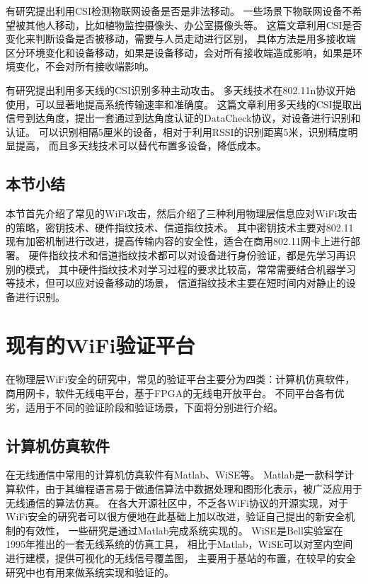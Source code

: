 		有研究提出利用CSI检测物联网设备是否是非法移动\cite{acsac15iot}。
		一些场景下物联网设备不希望被其他人移动，比如植物监控摄像头、办公室摄像头等。
		这篇文章利用CSI是否变化来判断设备是否被移动，需要与人员走动进行区别，
		具体方法是用多接收端区分环境变化和设备移动，如果是设备移动，会对所有接收端造成影响，如果是环境变化，不会对所有接收端影响。

		有研究提出利用多天线的CSI识别多种主动攻击\cite{mobicom13securearray}。
		多天线技术在802.11n协议开始使用，可以显著地提高系统传输速率和准确度。
		这篇文章利用多天线的CSI提取出信号到达角度，提出一套通过到达角度认证的DataCheck协议，对设备进行识别和认证。
		可以识别相隔5厘米的设备，相对于利用RSSI的识别距离5米\cite{wisec06spoofing}，识别精度明显提高，
		而且多天线技术可以替代布置多设备，降低成本。

		\subsection{本节小结}
		本节首先介绍了常见的WiFi攻击，然后介绍了三种利用物理层信息应对WiFi攻击的策略，密钥技术、硬件指纹技术、信道指纹技术。
		其中密钥技术主要对802.11现有加密机制进行改进，提高传输内容的安全性，适合在商用802.11网卡上进行部署。
		硬件指纹技术和信道指纹技术都可以对设备进行身份验证，都是先学习再识别的模式，
		其中硬件指纹技术对学习过程的要求比较高，常常需要结合机器学习等技术，但可以应对设备移动的场景，
		信道指纹技术主要在短时间内对静止的设备进行识别。

	\section{现有的WiFi验证平台}\label{sec:related_work}
	在物理层WiFi安全的研究中，常见的验证平台主要分为四类：计算机仿真软件，商用网卡，软件无线电平台，基于FPGA的无线电开放平台。
	不同平台各有优劣，适用于不同的验证阶段和验证场景，下面将分别进行介绍。

		\subsection{计算机仿真软件}
		在无线通信中常用的计算机仿真软件有Matlab、WiSE等。
		Matlab是一款科学计算软件，由于其编程语言易于做通信算法中数据处理和图形化表示，被广泛应用于无线通信的算法仿真。
		在各大开源社区中，不乏各WiFi协议的开源实现，对于WiFi安全的研究者可以很方便地在此基础上加以改进，验证自己提出的新安全机制的有效性，
		一些研究是通过Matlab完成系统实现的\cite{globecom14key, icnc13cognitive, infocom14relay}。
		WiSE是Bell实验室在1995年推出的一套无线系统的仿真工具\cite{bell95wise}，
		相比于Matlab，WiSE可以对室内空间进行建模，提供可视化的无线信号覆盖图，
		主要用于基站的布置，在较早的安全研究中也有用来做系统实现和验证的\cite{icc07xiao}。

